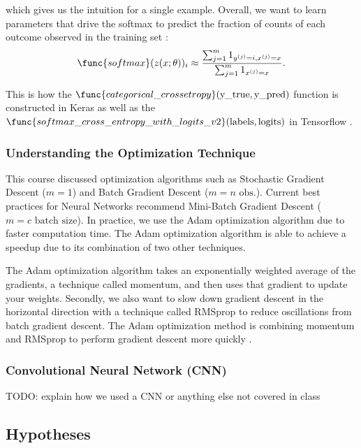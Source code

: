 \documentclass[12pt]{article}
\begin{document}
which gives us the intuition for a single example. Overall, we want to learn
parameters that drive the softmax to predict the fraction of counts of each
outcome observed in the training set \cite{Goodfellow-et-al-2016}:
\begin{equation}
  \func{softmax}(z(x;\theta))_i \approx \frac{\sum_{j=1}^m 1_{y^{(j)} = i,
      x^{(j)} = x}}{\sum_{j=1}^m 1_{x^{(j)} = x}}.
\end{equation}

This is how the $\func{categorical\_crossetropy}(\text{y\_true}, \text{y\_pred})$ function is constructed in Keras \cite{chollet2015keras} as well as the
$\func{softmax\_cross\_entropy\_with\_logits\_v2}(\text{labels}, \text{logits})$
in Tensorflow \cite{tensorflow2015-whitepaper}. 

\subsubsection{Understanding the Optimization Technique}

This course discussed optimization algorithms such as Stochastic Gradient
Descent ($m =1$) and Batch Gradient Descent ($m=n \text{ obs.}$). Current
best practices for Neural Networks recommend Mini-Batch Gradient Descent
($m = c \text{ batch size}$). In practice, we use the Adam optimization
algorithm due to faster computation time. The Adam optimization algorithm
is able to achieve a speedup due to its combination of two other techniques.

The Adam optimization algorithm takes an exponentially weighted average of
the gradients, a technique called momentum, and then uses that gradient to
update your weights. Secondly, we also want to slow down gradient descent in
the horizontal direction with a technique called RMSprop to reduce
oscillations from batch gradient descent. The Adam optimization method is
combining momentum and RMSprop to perform gradient descent more quickly
\cite{DeepLear51:online}.

\subsubsection{Convolutional Neural Network (CNN)}

TODO: explain how we used a CNN or anything else not covered in class

\subsection{Hypotheses}
\end{document}
